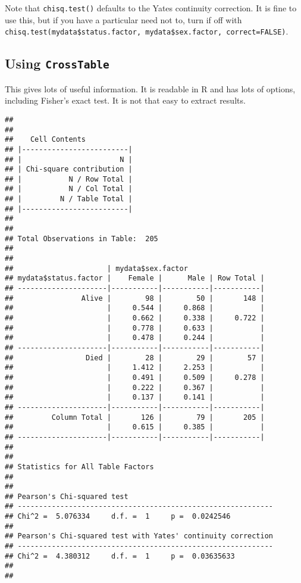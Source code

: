 \documentclass[]{book}
\makeatletter
\newenvironment{Shaded}{\begin{snugshade}}{\end{snugshade}}
\newcommand{\KeywordTok}[1]{\textcolor[rgb]{0.13,0.29,0.53}{\textbf{#1}}}
\newcommand{\DataTypeTok}[1]{\textcolor[rgb]{0.13,0.29,0.53}{#1}}
\newcommand{\CommentTok}[1]{\textcolor[rgb]{0.56,0.35,0.01}{\textit{#1}}}
\newcommand{\OtherTok}[1]{\textcolor[rgb]{0.56,0.35,0.01}{#1}}
\newcommand{\OperatorTok}[1]{\textcolor[rgb]{0.81,0.36,0.00}{\textbf{#1}}}
\newcommand{\NormalTok}[1]{#1}
\newenvironment{kframe}{%
\medskip{}
\setlength{\fboxsep}{.8em}
 \def\at@end@of@kframe{}%
 \ifinner\ifhmode%
  \def\at@end@of@kframe{\end{minipage}}%
  \begin{minipage}{\columnwidth}%
 \fi\fi%
 \def\FrameCommand##1{\hskip\@totalleftmargin \hskip-\fboxsep
 \colorbox{shadecolor}{##1}\hskip-\fboxsep
     \hskip-\linewidth \hskip-\@totalleftmargin \hskip\columnwidth}%
 \MakeFramed {\advance\hsize-\width
   \@totalleftmargin\z@ \linewidth\hsize
   \@setminipage}}%
 {\par\unskip\endMakeFramed%
 \at@end@of@kframe}
\renewenvironment{Shaded}{\begin{kframe}}{\end{kframe}}
\theoremstyle{definition}
\theoremstyle{definition}
\theoremstyle{definition}
\theoremstyle{remark}
\makeatother
\begin{document}
Note that \texttt{chisq.test()} defaults to the Yates continuity
correction. It is fine to use this, but if you have a particular need
not to, turn if off with
\texttt{chisq.test(mydata\$status.factor,\ mydata\$sex.factor,\ correct=FALSE)}.

\subsection{\texorpdfstring{Using
\texttt{CrossTable}}{Using CrossTable}}\label{using-crosstable}

This gives lots of useful information. It is readable in R and has lots
of options, including Fisher's exact test. It is not that easy to
extract results. \newpage

\begin{Shaded}
\end{Shaded}

\begin{verbatim}
## 
##  
##    Cell Contents
## |-------------------------|
## |                       N |
## | Chi-square contribution |
## |           N / Row Total |
## |           N / Col Total |
## |         N / Table Total |
## |-------------------------|
## 
##  
## Total Observations in Table:  205 
## 
##  
##                      | mydata$sex.factor 
## mydata$status.factor |    Female |      Male | Row Total | 
## ---------------------|-----------|-----------|-----------|
##                Alive |        98 |        50 |       148 | 
##                      |     0.544 |     0.868 |           | 
##                      |     0.662 |     0.338 |     0.722 | 
##                      |     0.778 |     0.633 |           | 
##                      |     0.478 |     0.244 |           | 
## ---------------------|-----------|-----------|-----------|
##                 Died |        28 |        29 |        57 | 
##                      |     1.412 |     2.253 |           | 
##                      |     0.491 |     0.509 |     0.278 | 
##                      |     0.222 |     0.367 |           | 
##                      |     0.137 |     0.141 |           | 
## ---------------------|-----------|-----------|-----------|
##         Column Total |       126 |        79 |       205 | 
##                      |     0.615 |     0.385 |           | 
## ---------------------|-----------|-----------|-----------|
## 
##  
## Statistics for All Table Factors
## 
## 
## Pearson's Chi-squared test 
## ------------------------------------------------------------
## Chi^2 =  5.076334     d.f. =  1     p =  0.0242546 
## 
## Pearson's Chi-squared test with Yates' continuity correction 
## ------------------------------------------------------------
## Chi^2 =  4.380312     d.f. =  1     p =  0.03635633 
## 
## 
\end{verbatim}
\end{document}
